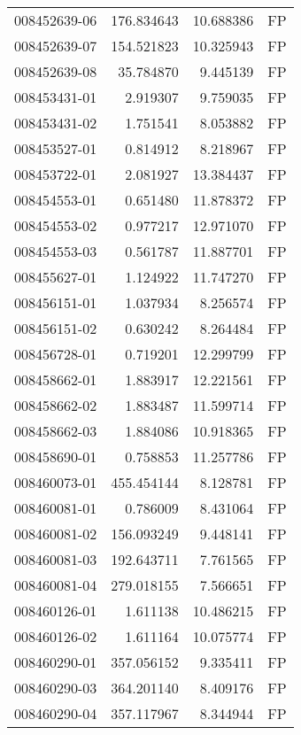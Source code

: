 \begin{tabular}{lrrl}
008452639-06 &  176.834643 &      10.688386 &   FP \\
008452639-07 &  154.521823 &      10.325943 &   FP \\
008452639-08 &   35.784870 &       9.445139 &   FP \\
008453431-01 &    2.919307 &       9.759035 &   FP \\
008453431-02 &    1.751541 &       8.053882 &   FP \\
008453527-01 &    0.814912 &       8.218967 &   FP \\
008453722-01 &    2.081927 &      13.384437 &   FP \\
008454553-01 &    0.651480 &      11.878372 &   FP \\
008454553-02 &    0.977217 &      12.971070 &   FP \\
008454553-03 &    0.561787 &      11.887701 &   FP \\
008455627-01 &    1.124922 &      11.747270 &   FP \\
008456151-01 &    1.037934 &       8.256574 &   FP \\
008456151-02 &    0.630242 &       8.264484 &   FP \\
008456728-01 &    0.719201 &      12.299799 &   FP \\
008458662-01 &    1.883917 &      12.221561 &   FP \\
008458662-02 &    1.883487 &      11.599714 &   FP \\
008458662-03 &    1.884086 &      10.918365 &   FP \\
008458690-01 &    0.758853 &      11.257786 &   FP \\
008460073-01 &  455.454144 &       8.128781 &   FP \\
008460081-01 &    0.786009 &       8.431064 &   FP \\
008460081-02 &  156.093249 &       9.448141 &   FP \\
008460081-03 &  192.643711 &       7.761565 &   FP \\
008460081-04 &  279.018155 &       7.566651 &   FP \\
008460126-01 &    1.611138 &      10.486215 &   FP \\
008460126-02 &    1.611164 &      10.075774 &   FP \\
008460290-01 &  357.056152 &       9.335411 &   FP \\
008460290-03 &  364.201140 &       8.409176 &   FP \\
008460290-04 &  357.117967 &       8.344944 &   FP \\

\end{tabular}
